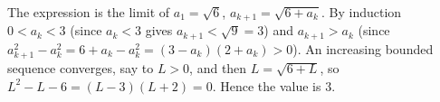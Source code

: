 The expression is the limit of $a_1=\sqrt6$, $a_{k+1}=\sqrt{6+a_k}$. By induction $0<a_k<3$ (since $a_k<3$ gives $a_{k+1}<\sqrt9=3$) and $a_{k+1}>a_k$ (since $a_{k+1}^2-a_k^2=6+a_k-a_k^2=(3-a_k)(2+a_k)>0$). An increasing bounded sequence converges, say to $L>0$, and then $L=\sqrt{6+L}$, so $L^2-L-6=(L-3)(L+2)=0$. Hence the value is $\boxed{3}$.
